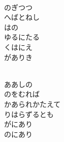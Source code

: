 \documentclass[10pt,b5j]{tarticle} %
\begin{document}
\vspace{1.5em} %
\newcommand{\linespace}{0.5em} %
\newcommand{\blocksize}{0.5\hsize} %
\newcommand{\itemmargin}{3em} %
\begin{enumerate} %
    \setlength{\itemindent}{\itemmargin} %
    \begin{minipage}[c]{\blocksize}
    
        \vspace{\linespace}
        \item~\\
        のぎつつ\\
        へばとねし\\
        はの\\
        ゆるにたる\\
        くはにえ\\
        がありき
        
    \end{minipage}
    \begin{minipage}[c]{\blocksize}
        
        \vspace{\linespace}
        \item~\\
        ああしの\\
        のをむれば\\
        かあられかたえて\\
        りはらずるとも\\
        がにあり\\
        のにあり
        
    \end{minipage}
    \begin{minipage}[c]{\blocksize}
        

\end{minipage}
\end{enumerate}
\end{document}
